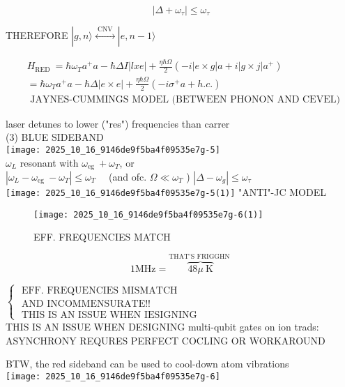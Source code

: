 $$
\left|\Delta+\omega_{\tau}\right| \leqslant \omega_{\tau}
$$

THEREFORE $|g, n\rangle \stackrel{\text { CNV }}{\longleftrightarrow}|e, n-1\rangle$

$$
\begin{aligned}
& H_{\text {RED }}=\hbar \omega_{T} a^{+} a-\hbar \Delta I|l x e|+\frac{\eta \hbar \Omega}{2}\left(-i|e \times g| a+i|g \times j| a^{+}\right) \\
& =\hbar \omega_{T} a^{+} a-\hbar \Delta|e \times e|+\frac{\eta \hbar \Omega}{2}\left(-i \sigma^{+} a+h . c .\right) \\
& \text { JAYNES-CUMMINGS MODEL (BETWEEN PHONON AND CEVEL) }
\end{aligned}
$$

laser detunes to lower ("res") frequencies than carrer\\
(3) BLUE SIDEBAND\\
\texttt{[image: 2025\_10\_16\_9146de9f5ba4f09535e7g-5]}\\
$\omega_{L}$ resonant with $\omega_{\text {eg }}+\omega_{T}$, or\\
$\left|\omega_{L}-\omega_{\text {eg }}-\omega_{T}\right| \leqslant \omega_{T} \quad$ (and ofc. $\Omega \ll \omega_{T}$ ) $\left|\Delta-\omega_{g}\right| \leqslant \omega_{\tau}$\\
\texttt{[image: 2025\_10\_16\_9146de9f5ba4f09535e7g-5(1)]} "ANTI"-JC MODEL

\begin{figure}[h]
\begin{center}
  \texttt{[image: 2025\_10\_16\_9146de9f5ba4f09535e7g-6(1)]}
\captionsetup{labelformat=empty}
\caption{EFF. FREQUENCIES MATCH}
\end{center}
\end{figure}

$$
1 \mathrm{MHz}=\overbrace{48 \mu \mathrm{~K}}^{\text {THAT'S FRIGGHN }}
$$

$\left\{\begin{array}{l}\text { EFF. FREQUENCIES MISMATCH } \\ \text { AND INCOMMENSURATE!! } \\ \text { THIS IS AN ISSUE WHEN IESIGNING }\end{array}\right.$\\
THIS IS AN ISSUE WHEN DESIGNING multi-qubit gates on ion trads: ASYNCHRONY REQURES PERFECT COCLING OR WORKAROUND

BTW, the red sideband can be used to cool-down atom vibrations\\
\texttt{[image: 2025\_10\_16\_9146de9f5ba4f09535e7g-6]}

